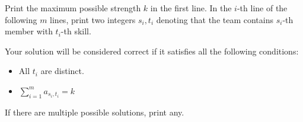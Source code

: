 Print the maximum possible strength $k$ in the first line.
In the $i$-th line of the following $m$ lines, print two integers $s_i,t_i$ denoting that the team contains $s_i$-th member with $t_i$-th skill.

Your solution will be considered correct if it satisfies all the following conditions:
\begin{itemize}
    \item All $t_i$ are distinct.
    \item $\displaystyle \sum_{i=1}^{m} a_{s_i,t_i} = k$
\end{itemize}
If there are multiple possible solutions, print any.